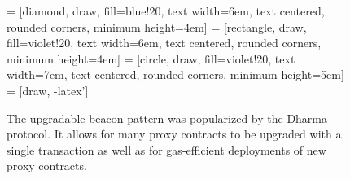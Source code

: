 \begin{figure}[ht] 
    \centering
     = [diamond, draw, fill=blue!20, 
    text width=6em, text centered, rounded corners, minimum height=4em] 
     = [rectangle, draw, fill=violet!20, 
    text width=6em, text centered, rounded corners, minimum height=4em]
     = [circle, draw, fill=violet!20, 
        text width=7em, text centered, rounded corners, minimum height=5em]
     = [draw, -latex']
    
    \caption{The upgradable beacon pattern was popularized by the Dharma protocol. It allows for many proxy contracts to be upgraded with a single
    transaction as well as for gas-efficient deployments of new proxy contracts.}
    \label{fig:UpgradePattern}
\end{figure}